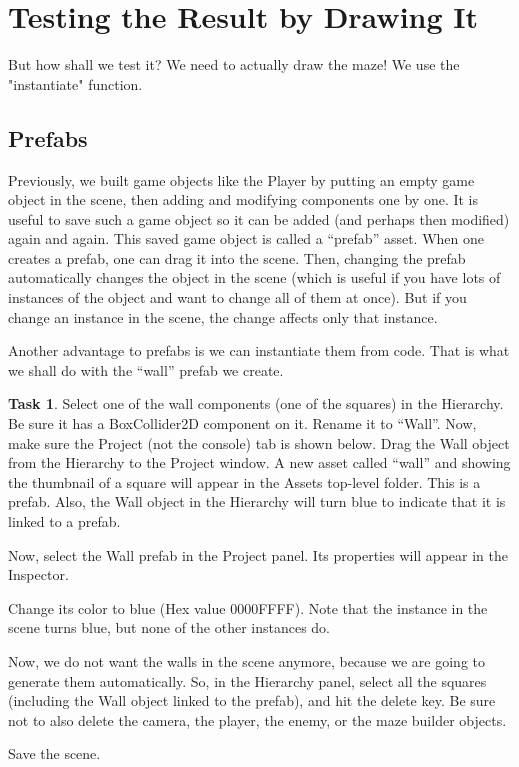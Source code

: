 \documentclass[12pt]{amsbook}
\theoremstyle{definition}
\newtheorem{task}[exercise]{Task}
\theoremstyle{remark}
\numberwithin{figure}{chapter}
\numberwithin{table}{chapter}
\numberwithin{section}{chapter}
\numberwithin{equation}{section}
\begin{document}
\section{Testing the Result by Drawing It}

But how shall we test it? We need to actually draw the maze!  We use the "instantiate" function.  

\subsection{Prefabs}
Previously, we built game objects like the Player by putting an empty game object in the scene, then adding and modifying components one by one.  It is useful to save such a game object so it can be added (and perhaps then modified) again and again.  This saved game object is called a ``prefab'' asset.  When one creates a prefab, one can drag it into the scene.  Then, changing the prefab automatically changes the object in the scene (which is useful if you have lots of instances of the object and want to change all of them at once).  But if you change an instance in the scene, the change affects only that instance.

Another advantage to prefabs is we can instantiate them from code.  That is what we shall do with the ``wall'' prefab we create.

\begin{task}\label{task:prefab}
Select one of the wall components (one of the squares) in the Hierarchy.  Be sure it has a BoxCollider2D component on it.  Rename it to ``Wall''.  Now, make sure the Project (not the console) tab is shown below.  Drag the Wall object from the Hierarchy to the Project window.  A new asset called ``wall'' and showing the thumbnail of a square will appear in the Assets top-level folder.  This is a prefab.  Also, the Wall object in the Hierarchy will turn blue to indicate that it is linked to a prefab.

Now, select the Wall prefab in the Project panel.  Its properties will appear in the Inspector.  

Change its color to blue (Hex value 0000FFFF).  Note that the instance in the scene turns blue, but none of the other instances do.

Now, we do not want the walls in the scene anymore, because we are going to generate them automatically.  So, in the Hierarchy panel, select all the squares (including the Wall object linked to the prefab), and hit the delete key.  Be sure not to also delete the camera, the player, the enemy, or the maze builder objects.

Save the scene.
\end{task}
\end{document}
